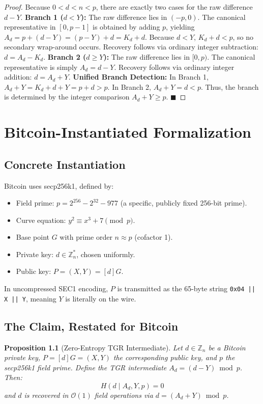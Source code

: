 \documentclass[11pt, a4paper, twoside]{book}
\newtheorem{proposition}[theorem]{Proposition}
\begin{document}
\begin{proof}
Because $0 < d < n < p$, there are exactly two cases for the raw difference $d - Y$. 
\textbf{Branch 1 ($d < Y$):} The raw difference lies in $(-p, 0)$. The canonical representative in $[0, p-1]$ is obtained by adding $p$, yielding $A_d = p + (d - Y) = (p - Y) + d = K_d + d$. Because $d < Y$, $K_d + d < p$, so no secondary wrap-around occurs. Recovery follows via ordinary integer subtraction: $d = A_d - K_d$.
\textbf{Branch 2 ($d \geq Y$):} The raw difference lies in $[0, p)$. The canonical representative is simply $A_d = d - Y$. Recovery follows via ordinary integer addition: $d = A_d + Y$.
\textbf{Unified Branch Detection:} In Branch 1, $A_d + Y = K_d + d + Y = p + d > p$. In Branch 2, $A_d + Y = d < p$. Thus, the branch is determined by the integer comparison $A_d + Y \geq p$. $\blacksquare$
\end{proof}

\chapter{Bitcoin-Instantiated Formalization}

\section{Concrete Instantiation}
Bitcoin uses secp256k1, defined by:
\begin{itemize}
    \item Field prime: $p = 2^{256} - 2^{32} - 977$ (a specific, publicly fixed 256-bit prime).
    \item Curve equation: $y^2 \equiv x^3 + 7 \pmod p$.
    \item Base point $G$ with prime order $n \approx p$ (cofactor 1).
    \item Private key: $d \in \mathbb{Z}_n^*$, chosen uniformly.
    \item Public key: $P = (X, Y) = [d]G$.
\end{itemize}
In uncompressed SEC1 encoding, $P$ is transmitted as the 65-byte string \texttt{0x04 || X || Y}, meaning $Y$ is literally on the wire.

\section{The Claim, Restated for Bitcoin}
\begin{proposition}[Zero-Entropy TGR Intermediate]
Let $d \in \mathbb{Z}_n$ be a Bitcoin private key, $P = [d]G = (X,Y)$ the corresponding public key, and $p$ the secp256k1 field prime. Define the TGR intermediate $A_d = (d - Y) \bmod p$. Then:
\begin{equation}
    H(d \mid A_d, Y, p) = 0
\end{equation}
and $d$ is recovered in $\mathcal{O}(1)$ field operations via $d = (A_d + Y) \bmod p$.
\end{proposition}
\end{document}
